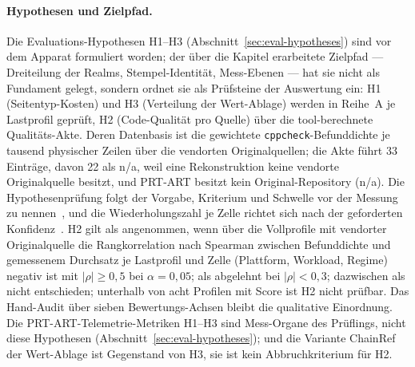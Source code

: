 \begin{nurlang}
\paragraph{Hypothesen und Zielpfad.} Die Evaluations-Hypothesen H1--H3
(Abschnitt~\ref{sec:eval-hypotheses}) sind vor dem Apparat formuliert worden; der über die Kapitel
erarbeitete Zielpfad --- Dreiteilung der Realms, Stempel-Identität, Mess-Ebenen --- hat sie nicht als
Fundament gelegt, sondern ordnet sie als Prüfsteine der Auswertung ein: H1 (Seitentyp-Kosten) und H3
(Verteilung der Wert-Ablage) werden in Reihe~A je Lastprofil geprüft, H2 (Code-Qualität pro Quelle)
über die tool-berechnete Qualitäts-Akte. Deren Datenbasis ist die gewichtete
\texttt{cppcheck}-Befunddichte je tausend physischer Zeilen über die vendorten Originalquellen; die
Akte führt 33 Einträge, davon 22 als n/a, weil eine Rekonstruktion keine vendorte Originalquelle
besitzt, und PRT-ART besitzt kein Original-Repository (n/a). Die Hypothesenprüfung folgt der Vorgabe,
Kriterium und Schwelle vor der Messung zu nennen~\cite{wohlin2012experimentation}, und die
Wiederholungszahl je Zelle richtet sich nach der geforderten Konfidenz~\cite{kalibera2013rigorous}.
H2 gilt als angenommen, wenn über die Vollprofile mit vendorter Originalquelle die Rangkorrelation nach
Spearman zwischen Befunddichte und gemessenem Durchsatz je Lastprofil und Zelle (Plattform, Workload,
Regime) negativ ist mit $|\rho| \geq 0{,}5$ bei $\alpha = 0{,}05$; als abgelehnt bei $|\rho| < 0{,}3$;
dazwischen als nicht entschieden; unterhalb von acht Profilen mit Score ist H2 nicht prüfbar. Das
Hand-Audit über sieben Bewertungs-Achsen bleibt die qualitative Einordnung. Die
PRT-ART-Telemetrie-Metriken H1--H3 sind Mess-Organe des Prüflings, nicht diese Hypothesen
(Abschnitt~\ref{sec:eval-hypotheses}); und die Variante ChainRef der Wert-Ablage ist Gegenstand von H3, sie ist kein
Abbruchkriterium für H2.
\end{nurlang}
